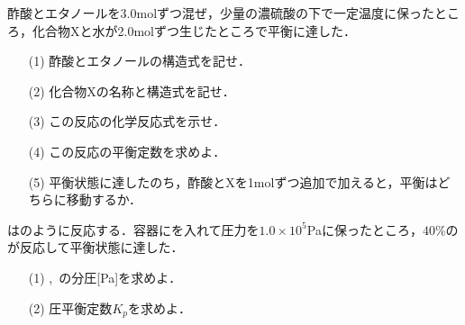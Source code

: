 \documentclass[a4paper,11pt]{ltjarticle}
\begin{document}
\begin{que}
酢酸とエタノールを3.0molずつ混ぜ，少量の濃硫酸の下で一定温度に保ったところ，化合物Xと水が2.0molずつ生じたところで平衡に達した．
\begin{itemize}
\item[(1)]酢酸とエタノールの構造式を記せ．
\item[(2)]化合物Xの名称と構造式を記せ．
\item[(3)]この反応の化学反応式を示せ．
\item[(4)]この反応の平衡定数を求めよ．
\item[(5)]平衡状態に達したのち，酢酸とXを1molずつ追加で加えると，平衡はどちらに移動するか． 

\end{itemize}
\end{que}
\ans
\newpage
\begin{que}
はのように反応する．容器にを入れて圧力を$1.0\times10^5$Paに保ったところ，$40\%$のが反応して平衡状態に達した．
\begin{itemize}
\item[(1)],~の分圧[Pa]を求めよ．
\item[(2)]圧平衡定数$K_p$を求めよ．
\end{itemize}
\end{que}
\ans
\newpage
\end{document}
